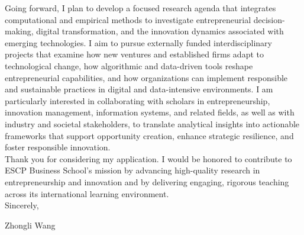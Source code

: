 \documentclass{nfr}
\begin{document}
Going forward, I plan to develop a focused research agenda that integrates computational and empirical methods to investigate entrepreneurial decision-making, digital transformation, and the innovation dynamics associated with emerging technologies. 
I aim to pursue externally funded interdisciplinary projects that examine how new ventures and established firms adapt to technological change, how algorithmic and data-driven tools reshape entrepreneurial capabilities, and how organizations can implement responsible and sustainable practices in digital and data-intensive environments. 
I am particularly interested in collaborating with scholars in entrepreneurship, innovation management, information systems, and related fields, as well as with industry and societal stakeholders, to translate analytical insights into actionable frameworks that support opportunity creation, enhance strategic resilience, and foster responsible innovation.\\

Thank you for considering my application. 
I would be honored to contribute to ESCP Business School’s mission by advancing high-quality research in entrepreneurship and innovation and by delivering engaging, rigorous teaching across its international learning environment.\\

\noindent Sincerely,\\
\vspace{5mm}

\noindent Zhongli Wang

\vspace{5mm}



\end{document}
